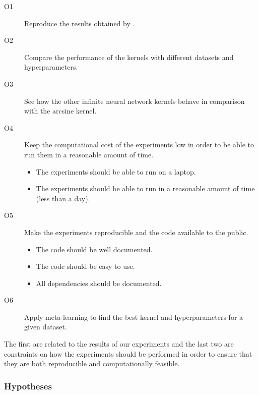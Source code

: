 \begin{description}
    \item[O1] Reproduce the results obtained by
        \textcite{frenayParameterinsensitiveKernelExtreme2011}.
    \item[O2] Compare the performance of the kernels with different datasets and
        hyperparameters.
    \item[O3] See how the other infinite neural network kernels behave in comparison
        with the arcsine kernel.
    \item[O4] Keep the computational cost of the experiments low in order to be
        able to run them in a reasonable amount of time.
        \begin{itemize}
            \item The experiments should be able to run on a laptop.
            \item The experiments should be able to run in a reasonable amount
                  of time (less than a day).
        \end{itemize}
    \item[O5] Make the experiments reproducible and the code available to the
        public. %
        \begin{itemize}
            \item The code should be well documented.
            \item The code should be easy to use.
            \item All dependencies should be documented.
        \end{itemize}
    \item[O6] Apply meta-learning to find the best kernel and hyperparameters
        for a given dataset.
\end{description}

The first are related to the results of our experiments and the last two are
constraints on how the experiments should be performed in order to ensure that
they are both reproducible and computationally feasible.

\subsubsection{Hypotheses}
\label{sec:objectives_and_hypotheses}


